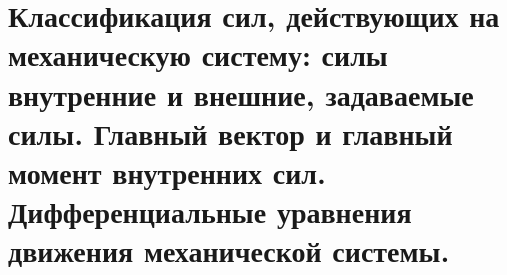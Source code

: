 \chapter{Классификация сил, действующих на механическую систему: силы внутренние
и внешние, задаваемые силы. Главный вектор и главный момент внутренних сил.
Дифференциальные уравнения движения механической системы.}

\newpage
